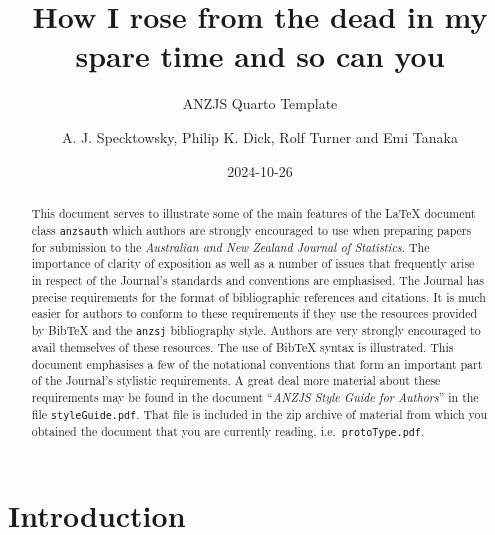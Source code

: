 \documentclass[
  times,
  doublespace]{anzsauth}
\title{How I rose from the dead in my spare time and so can you}
\subtitle{ANZJS Quarto Template}
\author{
A. J. Specktowsky\addressnum{1},
Philip K. Dick\addressnum{2},
Rolf Turner\addressnum{3} and 
Emi Tanaka
\addressnum{4}\corrauth
}
\affiliation{
School of Hard Knocks, 
School of Design Terrace, 
University of Auckland and 
The Australian National University
}
\date{2024-10-26}
\begin{document}
\begin{abstract}
This document serves to illustrate some of the main features of the
LaTeX document class \texttt{anzsauth} which authors are strongly
encouraged to use when preparing papers for submission to the
\emph{Australian and New Zealand Journal of Statistics}. The importance
of clarity of exposition as well as a number of issues that frequently
arise in respect of the Journal's standards and conventions are
emphasised. The Journal has precise requirements for the format of
bibliographic references and citations. It is much easier for authors to
conform to these requirements if they use the resources provided by
BibTeX and the \texttt{anzsj} bibliography style. Authors are very
strongly encouraged to avail themselves of these resources. The use of
BibTeX syntax is illustrated. This document emphasises a few of the
notational conventions that form an important part of the Journal's
stylistic requirements. A great deal more material about these
requirements may be found in the document ``\emph{ANZJS Style Guide for
Authors}'' in the file \texttt{styleGuide.pdf}. That file is included in
the zip archive of material from which you obtained the document that
you are currently reading, i.e.~\texttt{protoType.pdf}.
\end{abstract}

          

\maketitle

\section{Introduction}\label{sec-intro}
\end{document}
